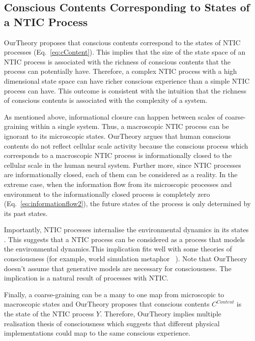 \documentclass[utf8]{article}
\begin{document}
    			
		\subsection{Conscious Contents Corresponding to States of a NTIC Process}\label{sec:cc}
    		\ac{OurTheory} proposes that conscious contents correspond to the states of NTIC processes (Eq.~\ref{eq:cContent}). This implies that the size of the state space of an NTIC process is associated with the richness of conscious contents that the process can potentially have. Therefore, a complex NTIC process with a high dimensional state space can have richer conscious experience than a simple NTIC process can have. This outcome is consistent with the intuition that the richness of conscious contents is associated with the complexity of a system. 
    		
    		As mentioned above, informational closure can happen between scales of coarse-graining within a single system. Thus, a macroscopic NTIC process can be ignorant to its microscopic states. \ac{OurTheory} argues that human conscious contents do not reflect cellular scale activity because the conscious process which corresponds to a macroscopic NTIC process is informationally closed to the cellular scale in the human neural system. Further more, since NTIC processes are informationally closed, each of them can be considered as a reality. In the extreme case, when the information flow from its microscopic processes and environment to the informationally closed process is completely zero (Eq.~\ref{eq:informationflow2}), the future states of the process is only determined by its past states. 
    		
    		Importantly, NTIC processes internalise the environmental dynamics in its states \citep[also see P.~4][]{BERTSCHINGER.2006}. This suggests that a NTIC process can be considered as a process that models the environmental dynamics.This implication fits well with some theories of consciousness (for example, world simulation metaphor ~\citep{revonsuo2006inner}). Note that \ac{OurTheory} doesn't assume that generative models are necessary for consciousness. The implication is a natural result of processes with NTIC. 
            
            Finally, a coarse-graining can be a many to one map from microscopic to macroscopic states and \ac{OurTheory} proposes that conscious contents $C^{Content}$ is the state of the NTIC process $Y$. Therefore, \ac{OurTheory} implies multiple realisation thesis of consciousness \citep{putnam1967psychological,bechtel1999multiple} which suggests that different physical implementations could map to the same conscious experience.
            
\end{document}
